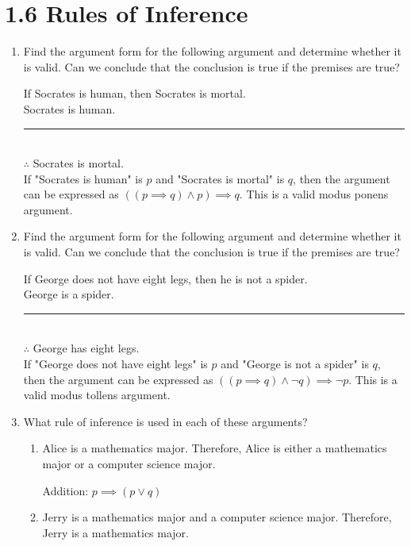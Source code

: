 \documentclass[11pt]{article}
\begin{document}
\section*{\textbf{1.6 Rules of Inference}}
\begin{enumerate}[label=\textbf{\arabic*.}]
	\item Find the argument form for the following argument and determine whether it is valid. Can we conclude that the conclusion is true if the premises are true?
	
	If Socrates is human, then Socrates is mortal. \\
	Socrates is human. \\
	\rule[0.75ex]{7.6cm}{0.4pt} \\
	$\therefore$ Socrates is mortal. \\
	
	If "Socrates is human" is $p$ and "Socrates is mortal" is $q$, then the argument can be expressed as $((p \implies q) \land p) \implies q$. This is a valid modus ponens argument.
	
	\item Find the argument form for the following argument and determine whether it is valid. Can we conclude that the conclusion is true if the premises are true?
	
	If George does not have eight legs, then he is not a spider. \\
	George is a spider. \\
	\rule[0.75ex]{9.7cm}{0.4pt} \\
	$\therefore$ George has eight legs. \\
	
	If "George does not have eight legs" is $p$ and "George is not a spider" is $q$, then the argument can be expressed as $((p \implies q) \land \neg q) \implies \neg p$. This is a valid modus tollens argument.
	
	\item What rule of inference is used in each of these arguments?
	\begin{enumerate}[label=\textbf{\alph*)}]
		\item Alice is a mathematics major. Therefore, Alice is either a mathematics major or a computer science major.
		
		Addition: $p \implies (p \lor q)$
		
		\item Jerry is a mathematics major and a computer science major. Therefore, Jerry is a mathematics major.
		

\end{enumerate}
\end{enumerate}
\end{document}
